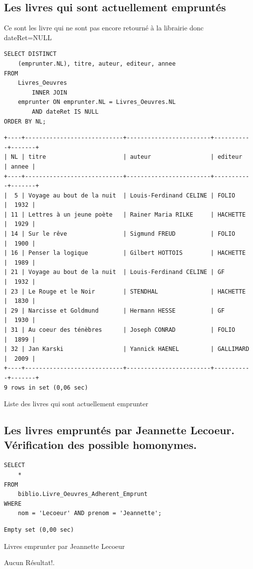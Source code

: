 \documentclass{article}
\begin{document}
\subsection{Les livres qui sont actuellement empruntés}
Ce sont les livre qui ne sont pas encore retourné à la librairie donc dateRet=NULL
\begin{listing}[H]
	\begin{verbatim}
SELECT DISTINCT
	(emprunter.NL), titre, auteur, editeur, annee
FROM
	Livres_Oeuvres
		INNER JOIN
	emprunter ON emprunter.NL = Livres_Oeuvres.NL
		AND dateRet IS NULL
ORDER BY NL;
\end{verbatim}
\begin{verbatim}
+----+----------------------------+------------------------+-----------+-------+
| NL | titre                      | auteur                 | editeur   | annee |
+----+----------------------------+------------------------+-----------+-------+
|  5 | Voyage au bout de la nuit  | Louis-Ferdinand CELINE | FOLIO     |  1932 |
| 11 | Lettres à un jeune poète   | Rainer Maria RILKE     | HACHETTE  |  1929 |
| 14 | Sur le rêve                | Sigmund FREUD          | FOLIO     |  1900 |
| 16 | Penser la logique          | Gilbert HOTTOIS        | HACHETTE  |  1989 |
| 21 | Voyage au bout de la nuit  | Louis-Ferdinand CELINE | GF        |  1932 |
| 23 | Le Rouge et le Noir        | STENDHAL               | HACHETTE  |  1830 |
| 29 | Narcisse et Goldmund       | Hermann HESSE          | GF        |  1930 |
| 31 | Au coeur des ténèbres      | Joseph CONRAD          | FOLIO     |  1899 |
| 32 | Jan Karski                 | Yannick HAENEL         | GALLIMARD |  2009 |
+----+----------------------------+------------------------+-----------+-------+
9 rows in set (0,06 sec)
\end{verbatim}
	\caption{Liste des livres qui sont actuellement emprunter}
\end{listing}

\subsection{Les livres empruntés par Jeannette Lecoeur. Vérification des possible homonymes.}
\begin{listing}[H]
\begin{verbatim}
SELECT 
	*
FROM
	biblio.Livre_Oeuvres_Adherent_Emprunt
WHERE
	nom = 'Lecoeur' AND prenom = 'Jeannette';
\end{verbatim}
\begin{verbatim}
Empty set (0,00 sec)
\end{verbatim}
\caption{Livres emprunter par Jeannette Lecoeur}
\end{listing}
Aucun Résultat!.
\end{document}
